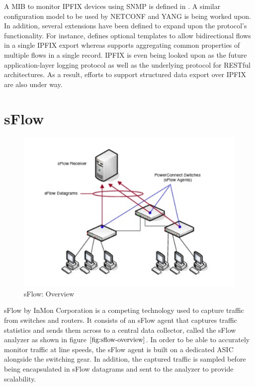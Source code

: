 A \ac{MIB} to monitor \ac{IPFIX} devices using \ac{SNMP} is defined in \cite{rfc5815}. A similar configuration model to be used by NETCONF and YANG is being worked upon. In addition, several extensions have been defined to expand upon the protocol's functionality. For  instance, \cite{rfc5103} defines optional templates to allow bidirectional flows in a single \ac{IPFIX} export whereas \cite{rfc5474} supports aggregating common properties of multiple flows in a single record. \ac{IPFIX} is even being looked upon as the future application-layer logging protocol as well as the underlying protocol for RESTful architectures. As a result, efforts to support structured data export over \ac{IPFIX} are also under way.

\section{sFlow}\label{sec:sflow}

\begin{figure}[h!]
\begin{center}
  \includegraphics* [width=0.6\linewidth]{figures/sflow-overview}	
  \caption{sFlow: Overview \cite{dell-userguide}}
  \label{fig:sflow-overview}
\end{center}
\end{figure}
sFlow \cite{rfc3176} by InMon Corporation is a competing technology used to capture traffic from switches and routers. It consists of an sFlow agent that captures traffic statistics and sends them across to a central data collector, called the sFlow analyzer as shown in figure $\ref{fig:sflow-overview}$. In order to be able to accurately monitor traffic at line speeds, the sFlow agent is built on a dedicated ASIC alongside the switching gear. In addition, the captured traffic is sampled before being encapsulated in sFlow datagrams and sent to the analyzer to provide scalability.

